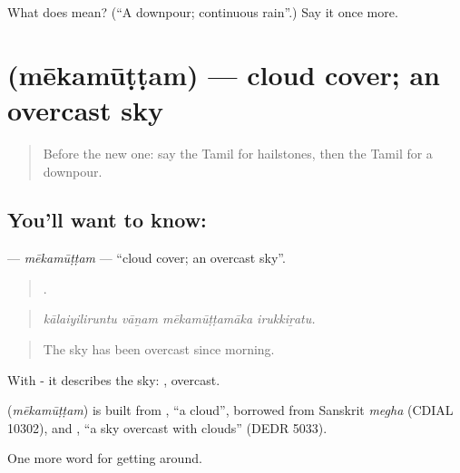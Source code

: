 \begin{tcolorbox}[breakable,colback=teal!4,colframe=teal!35!black,title={Before you move on}]
What does  mean? (\textquotedblleft{}A downpour; continuous rain\textquotedblright{}.) Say it once more.
\end{tcolorbox}
\section[\texorpdfstring{\ta{மேகமூட்டம்} (mēkamūṭṭam)}{மேகமூட்டம் (mēkamūṭṭam)}]{ (mēkamūṭṭam) — cloud cover; an overcast sky}

\label{lesson:TA-C429-mekamuttam}



\begin{quote}
Before the new one: say the Tamil for hailstones, then the Tamil for a downpour.
\end{quote}

\subsection*{You'll want to know: }
\textbf{} — \emph{mēkamūṭṭam} — \textquotedblleft{}cloud cover; an overcast sky\textquotedblright{}.

\begin{quote}
   .
\end{quote}

\begin{quote}
\emph{kālaiyiliruntu vāṉam mēkamūṭṭamāka irukkiṟatu.}
\end{quote}

\begin{quote}
The sky has been overcast since morning.
\end{quote}

With - it describes the sky: , overcast.

\begin{cousinweb}
\textbf{} (\emph{mēkamūṭṭam}) is built from , \textquotedblleft{}a cloud\textquotedblright{}, borrowed from Sanskrit \emph{megha} (CDIAL 10302), and , \textquotedblleft{}a sky overcast with clouds\textquotedblright{} (DEDR 5033).
\end{cousinweb}

\begin{grammarlens}[title={What you've built}]
One more word for getting around.
\end{grammarlens}

